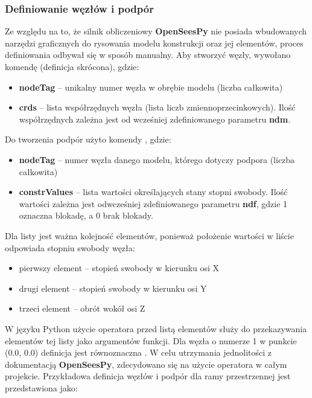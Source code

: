 \subsubsection{Definiowanie węzłów i podpór}

Ze względu na to, że silnik obliczeniowy \textbf{OpenSeesPy} nie posiada wbudowanych narzędzi graficznych do rysowania
modelu konstrukcji oraz jej elementów, proces definiowania odbywał się w sposób manualny.
Aby stworzyć węzły, wywołano komendę  (definicja skrócona), gdzie:

\begin{itemize}
    \item \textbf{nodeTag} – unikalny numer węzła w obrębie modelu (liczba całkowita)
    \item \textbf{crds} – lista współrzędnych węzła (lista liczb zmiennoprzecinkowych). Ilość współrzędnych zależna jest od wcześniej zdefiniowanego parametru \textbf{ndm}.
\end{itemize}

Do tworzenia podpór użyto komendy , gdzie:

\begin{itemize}
    \item \textbf{nodeTag} – numer węzła danego modelu, którego dotyczy podpora (liczba całkowita)
    \item \textbf{constrValues} – lista wartości określających stany stopni swobody. Ilość wartości zależna jest odwcześniej zdefiniowanego parametru \textbf{ndf}, gdzie 1 oznaczna blokadę, a 0 brak blokady.
\end{itemize}

Dla listy  jest ważna kolejność elementów, ponieważ położenie wartości w liście odpowiada stopniu swobody węzła:
\begin{itemize}
    \item pierwszy element – stopień swobody w kierunku osi X
    \item drugi element – stopień swobody w kierunku osi Y
    \item trzeci element – obrót wokół osi Z
\end{itemize}

W języku Python użycie operatora \ilc{*} przed listą elementów służy do przekazywania elementów tej listy jako argumentów funkcji.
Dla węzła o numerze 1 w punkcie (0.0, 0.0) definicja  jest równoznaczna .
W celu utrzymania jednolitości z dokumentacją \textbf{OpenSeesPy}, zdecydowano się na użycie operatora \ilc{*} w całym projekcie.
Przykładowa definicja węzłów i podpór dla ramy przestrzennej jest przedstawiona jako:

